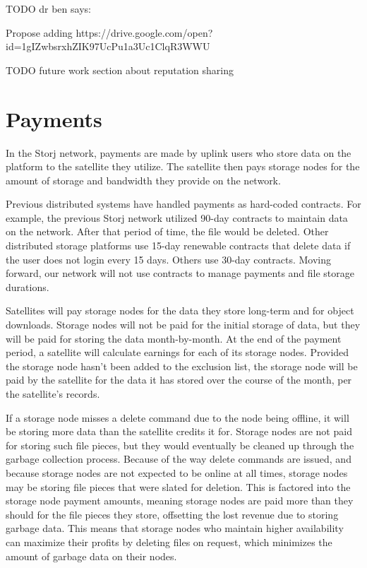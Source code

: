 \documentclass[11pt,fleqn,openany]{book}
\newcommand{\todo}[1]{{\color{red} TODO #1 }}
\begin{document}
\todo{dr ben says:

Propose adding https://drive.google.com/open?id=1gIZwbsrxhZIK97UcPu1a3Uc1ClqR3WWU
}

\todo{future work section about reputation sharing}

\section{Payments}\label{sec:concrete-payments}

In the Storj network, payments are made by uplink users who store data on the
platform to the satellite they utilize.
The satellite then pays storage nodes for the amount of storage and bandwidth
they
provide on the network.

Previous distributed systems have handled payments as hard-coded contracts.
For example, the previous Storj network utilized 90-day contracts to maintain
data on the network. After that period of time, the file would be deleted.
Other distributed storage platforms use 15-day renewable contracts that delete
data if the user does not login every 15 days. Others use 30-day contracts.
Moving forward, our network will not use contracts to manage payments and file
storage durations.

Satellites will pay storage nodes for the data they store long-term
and for object downloads.
Storage nodes will not be paid for the initial storage of data, but they
will be paid for storing the data month-by-month. At the end of the payment
period, a satellite will calculate earnings for each of its storage nodes.
Provided the storage node hasn't been added to the exclusion list,
the storage node will be paid by the satellite for the data it has stored
over the course of
the month, per the satellite's records.

If a storage node misses a delete command due to the node being
offline, it will be storing more data than the satellite credits it for.
Storage nodes are not paid for storing such file pieces, but they
would eventually be cleaned up through the garbage collection process.
Because of the
way delete commands are issued, and because storage nodes are not expected to be
online at all times, storage nodes may be storing file pieces that were slated
for
deletion. This is factored into
the storage node payment amounts, meaning storage nodes are paid more than they
should for the file pieces they store, offsetting the lost revenue due to
storing garbage data.
This means that storage nodes who maintain higher availability
can maximize their profits by deleting files on request,
which minimizes the amount
of garbage data on their nodes.
\end{document}
